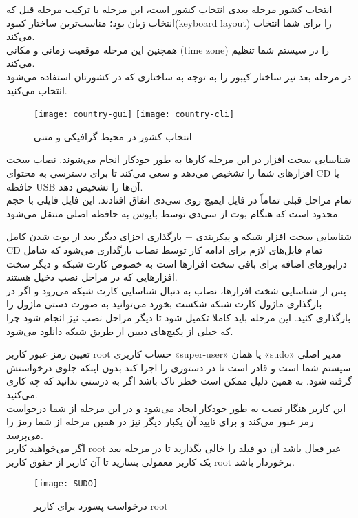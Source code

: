 \begin{frame}{انتخاب کشور}
  مرحله بعدی انتخاب کشور است، این مرحله با ترکیب مرحله قبل که انتخاب زبان بود؛ مناسب‌ترین ساختار کیبود(keyboard layout) را برای شما انتخاب می‌کند.\\
  همچنین این مرحله موقعیت زمانی و مکانی (time zone) را در سیستم شما تنظیم می‌کند.\\
  در مرحله بعد نیز ساختار کیبور را به توجه به ساختاری که در کشورتان استفاده می‌شود انتخاب می‌کنید.
  \begin{figure}
    \texttt{[image: country-gui]}
    \texttt{[image: country-cli]}
    \caption{انتخاب کشور در محیط گرافیکی و متنی~\cite{fig:deb_country_gui}}
  \end{figure}
\end{frame}
\begin{frame}{شناسایی سخت افزار}
  در این مرحله کارها به طور خودکار انجام می‌شوند. نصاب سخت افزارهای شما را تشخیص می‌دهد و سعی می‌کند تا برای دسترسی به محتوای CD یا حافظه USB آن‌ها را تشخیص دهد.\\
  تمام مراحل قبلی تماماً در فایل ایمیج روی سی‌دی اتفاق افتادند. این فایل فایلی با حجم محدود است که هنگام بوت از سی‌دی توسط بایوس به حافظه اصلی منتقل می‌شود.
\end{frame}
\begin{frame}{شناسایی سخت افزار شبکه و پیکربندی + بارگذاری اجزای دیگر}
  بعد از بوت شدن کامل CD تمام فایل‌های لازم برای ادامه کار توسط نصاب بارگذاری می‌شود که شامل درایورهای اضافه برای باقی سخت افزارها است به خصوص کارت شبکه و دیگر سخت افزارهایی که در مراحل نصب دخیل هستند.\\
  پس از شناسایی شخت افزارها، نصاب به دنبال شناسایی کارت شبکه می‌رود و اگر در بارگذاری ماژول کارت شبکه شکست بخورد می‌توانید به صورت دستی ماژول را بارگذاری کنید.
  این مرحله باید کاملا تکمیل شود تا دیگر مراحل نصب نیز انجام شود چرا که خیلی از پکیج‌های دبیین از طریق شبکه دانلود می‌شود.
\end{frame}
\begin{frame}{تعیین رمز عبور کاربر root}
  حساب کاربری «super-user» یا همان «sudo» مدیر اصلی سیستم شما است و قادر است تا در دستوری را اجرا کند بدون اینکه جلوی درخواستش گرفته شود. به همین دلیل ممکن است خطر ناک باشد اگر به درستی ندانید که چه کاری می‌کنید.\\
  این کاربر هنگار نصب به طور خودکار ایجاد می‌شود و در این مرحله از شما درخواست رمز عبور می‌کند و برای تایید آن یکبار دیگر نیز در همین مرحله از شما رمز را می‌پرسد.\\
  اگر می‌خواهید کاربر root غیر فعال باشد آن دو فیلد را خالی بگذارید تا در مرحله بعد یک کاربر معمولی بسازید تا آن کاربر از حقوق کاربر root برخوردار باشد.
  \begin{figure}
    \texttt{[image: SUDO]}
    \caption{درخواست پسورد برای کاربر root~\cite{fig:deb_user_root}}
  \end{figure}
\end{frame}
